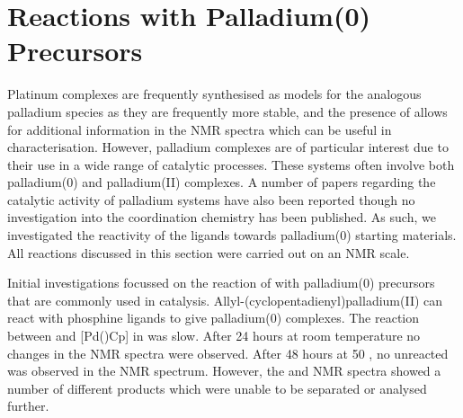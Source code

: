 %
%
%
%
%
%




\section{Reactions with Palladium(0) Precursors}

Platinum complexes are frequently synthesised as models for the analogous palladium species as they are frequently more stable, and the presence of \Pt{} allows for additional information in the NMR spectra which can be useful in characterisation.  However, palladium complexes are of particular interest due to their use in a wide range of catalytic processes.  These systems often involve both palladium(0) and palladium(II) complexes.  A number of papers regarding the catalytic activity of palladium \tBuxantphos{} systems have also been reported though no investigation into the coordination chemistry has been published.  As such, we investigated the reactivity of the \tBuxantphos{} ligands towards palladium(0) starting materials.  All reactions discussed in this section were carried out on an NMR scale.  

Initial investigations focussed on the reaction of \tButhixantphos{} with palladium(0) precursors that are commonly used in catalysis.  Allyl-(cyclopentadienyl)palladium(II) can react with phosphine ligands to give palladium(0) complexes.  The reaction between \tButhixantphos{} and [Pd()Cp] in  was slow.  After 24 hours at room temperature no changes in the NMR spectra were observed.  After 48 hours at 50 \degC, no unreacted \tButhixantphos{} was observed in the \phosphorus{} NMR spectrum.  However, the \phosphorus{} and \proton{} NMR spectra showed a number of different products which were unable to be separated or analysed further.

